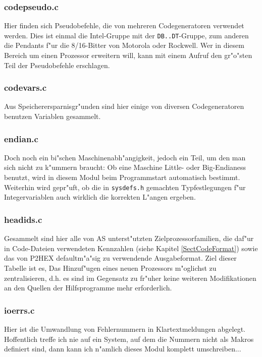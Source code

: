 \documentclass[12pt,a4paper,twoside]{report}
\newcommand{\tty}[1]{{\tt #1}}
\begin{document}
{\subsubsection{codepseudo.c}

Hier finden sich Pseudobefehle, die von mehreren Codegeneratoren verwendet
werden.  Dies ist einmal die Intel-Gruppe mit der \tty{DB..DT}-Gruppe,
zum anderen die Pendants f"ur die 8/16-Bitter von Motorola oder Rockwell.
Wer in diesem Bereich um einen Prozessor erweitern will, kann mit einem
Aufruf den gr"o"sten Teil der Pseudobefehle erschlagen.

\subsubsection{codevars.c}

Aus Speicherersparnisgr"unden sind hier einige von diversen
Codegeneratoren benutzen Variablen gesammelt.

\subsubsection{endian.c}

Doch noch ein bi"schen Maschinenabh"angigkeit, jedoch ein Teil, um den man
sich nicht zu k"ummern braucht: Ob eine Maschine Little- oder
Big-Endianess benutzt, wird in diesem Modul beim Programmstart automatisch
bestimmt.  Weiterhin wird gepr"uft, ob die in {\tt sysdefs.h} gemachten
Typfestlegungen f"ur Integervariablen auch wirklich die korrekten L"angen
ergeben.

\subsubsection{headids.c}

Gesammelt sind hier alle von AS unterst"utzten Zielprozessorfamilien, die
daf"ur in Code-Dateien verwendeten Kennzahlen (siehe Kapitel
\ref{SectCodeFormat}) sowie das von P2HEX defaultm"a"sig zu verwendende
Ausgabeformat.  Ziel dieser Tabelle ist es, Das Hinzuf"ugen eines neuen
Prozessors m"oglichst zu zentralisieren, d.h. es sind im Gegensatz zu
fr"uher keine weiteren Modifikationen an den Quellen der Hilfsprogramme
mehr erforderlich.

\subsubsection{ioerrs.c}

Hier ist die Umwandlung von Fehlernummern in Klartextmeldungen abgelegt. 
Hoffentlich treffe ich nie auf ein System, auf dem die Nummern nicht als
Makros definiert sind, dann kann ich n"amlich dieses Modul komplett
umschreiben...

}
\end{document}
